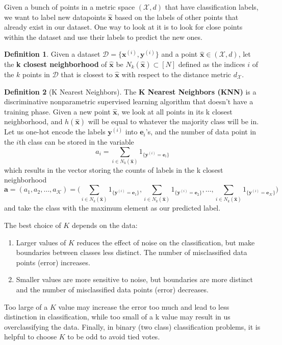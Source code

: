 \documentclass{article}
\theoremstyle{definition}
\theoremstyle{remark}
\theoremstyle{definition}
\newtheorem{definition}{Definition}[section]
\begin{document}
Given a bunch of points in a metric space $(\mathcal{X}, d)$ that have classification labels, we want to label new datapoints $\hat{\mathbf{x}}$ based on the labels of other points that already exist in our dataset. One way to look at it is to look for close points within the dataset and use their labels to predict the new ones. 

\begin{definition}
Given a dataset $\mathcal{D} = \{\mathbf{x}^{(i)}, \mathbf{y}^{(i)}\}$ and a point $\hat{\mathbf{x}} \in (\mathcal{X}, d)$, let the \textbf{k closest neighborhood} of $\hat{\mathbf{x}}$ be $N_k (\hat{\mathbf{x}}) \subset [N]$ defined as the indices $i$ of the $k$ points in $\mathcal{D}$ that is closest to $\hat{\mathbf{x}}$ with respect to the distance metric $d_\mathcal{X}$. 
\end{definition}

\begin{definition}[K Nearest Neighbors]
The \textbf{K Nearest Neighbors (KNN)} is a discriminative nonparametric supervised learning algorithm that doesn't have a training phase. Given a new point $\hat{\mathbf{x}}$, we look at all points in its k closest neighborhood, and $h(\hat{\mathbf{x}})$ will be equal to whatever the majority class will be in. Let us one-hot encode the labels $\mathbf{y}^{(i)}$ into $\mathbf{e}_i$'s, and the number of data point in the $i$th class can be stored in the variable 
\[a_i = \sum_{i \in N_k (\hat{\mathbf{x}})} 1_{\{\mathbf{y}^{(i)} = \mathbf{e}_i\}}\]
which results in the vector storing the counts of labels in the k closest neighborhood 
\[\mathbf{a} = (a_1, a_2, \ldots, a_\mathcal{K}) = \bigg( \sum_{i \in N_k (\hat{\mathbf{x}})} 1_{\{\mathbf{y}^{(i)} = \mathbf{e}_1\}}, \sum_{i \in N_k (\hat{\mathbf{x}})} 1_{\{\mathbf{y}^{(i)} = \mathbf{e}_2\}}, \ldots, \sum_{i \in N_k (\hat{\mathbf{x}})} 1_{\{\mathbf{y}^{(i)} = \mathbf{e}_\mathcal{K}\}} \bigg)  \]
and take the class with the maximum element as our predicted label. 
\end{definition}

The best choice of $K$ depends on the data: 
\begin{enumerate}
    \item Larger values of $K$ reduces the effect of noise on the classification, but make boundaries between classes less distinct. The number of misclassified data points (error) increases. 
    \item Smaller values are more sensitive to noise, but boundaries are more distinct and the number of misclassified data points (error) decreases.
\end{enumerate}
Too large of a $K$ value may increase the error too much and lead to less distinction in classification, while too small of a k value may result in us overclassifying the data. Finally, in binary (two class) classification problems, it is helpful to choose $K$ to be odd to avoid tied votes.
\end{document}
